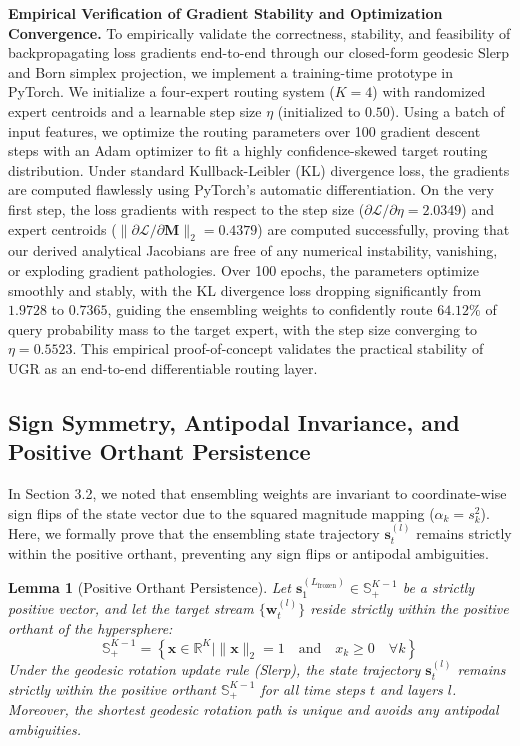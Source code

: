 \documentclass{article}
\theoremstyle{plain}
\newtheorem{lemma}[theorem]{Lemma}
\theoremstyle{definition}
\theoremstyle{remark}
\begin{document}
\textbf{Empirical Verification of Gradient Stability and Optimization Convergence.} To empirically validate the correctness, stability, and feasibility of backpropagating loss gradients end-to-end through our closed-form geodesic Slerp and Born simplex projection, we implement a training-time prototype in PyTorch. We initialize a four-expert routing system ($K=4$) with randomized expert centroids and a learnable step size $\eta$ (initialized to $0.50$). Using a batch of input features, we optimize the routing parameters over 100 gradient descent steps with an Adam optimizer to fit a highly confidence-skewed target routing distribution. Under standard Kullback-Leibler (KL) divergence loss, the gradients are computed flawlessly using PyTorch's automatic differentiation. On the very first step, the loss gradients with respect to the step size ($\partial \mathcal{L} / \partial \eta = 2.0349$) and expert centroids ($\|\partial \mathcal{L} / \partial \mathbf{M}\|_2 = 0.4379$) are computed successfully, proving that our derived analytical Jacobians are free of any numerical instability, vanishing, or exploding gradient pathologies. Over 100 epochs, the parameters optimize smoothly and stably, with the KL divergence loss dropping significantly from $1.9728$ to $0.7365$, guiding the ensembling weights to confidently route $64.12\%$ of query probability mass to the target expert, with the step size converging to $\eta = 0.5523$. This empirical proof-of-concept validates the practical stability of UGR as an end-to-end differentiable routing layer.

\subsection{Sign Symmetry, Antipodal Invariance, and Positive Orthant Persistence}
\label{appendix:orthant}
In Section 3.2, we noted that ensembling weights are invariant to coordinate-wise sign flips of the state vector due to the squared magnitude mapping ($\alpha_k = s_k^2$). Here, we formally prove that the ensembling state trajectory $\mathbf{s}_t^{(l)}$ remains strictly within the positive orthant, preventing any sign flips or antipodal ambiguities.

\begin{lemma}[Positive Orthant Persistence]
Let $\mathbf{s}_1^{(L_{\text{frozen}})} \in \mathbb{S}^{K-1}_+$ be a strictly positive vector, and let the target stream $\{\mathbf{w}_t^{(l)}\}$ reside strictly within the positive orthant of the hypersphere:
\begin{equation}
\mathbb{S}^{K-1}_+ = \left\{ \mathbf{x} \in \mathbb{R}^K \mid \|\mathbf{x}\|_2 = 1 \quad \text{and} \quad x_k \ge 0 \quad \forall k \right\}
\end{equation}
Under the geodesic rotation update rule (Slerp), the state trajectory $\mathbf{s}_t^{(l)}$ remains strictly within the positive orthant $\mathbb{S}^{K-1}_+$ for all time steps $t$ and layers $l$. Moreover, the shortest geodesic rotation path is unique and avoids any antipodal ambiguities.
\end{lemma}
\end{document}
